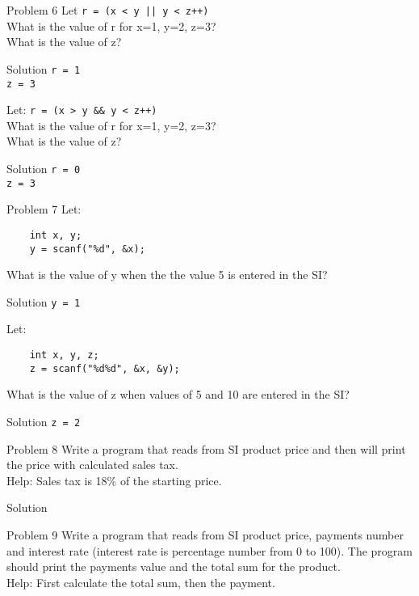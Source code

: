 \begin{frame}[fragile]{Problem 6}
Let \texttt{r = (x < y || y < z++)}\\
	What is the value of r for x=1, y=2, z=3?\\
	What is the value of z?
	\begin{exampleblock}{Solution}
	\texttt{r = 1\\z = 3}
	\end{exampleblock}
Let: \texttt{r = (x > y \&\& y < z++)}\\
	What is the value of r for x=1, y=2, z=3?\\
	What is the value of z?
	\begin{exampleblock}{Solution}
	\texttt{r = 0\\z = 3}
	\end{exampleblock}
\end{frame}

\begin{frame}[fragile]{Problem 7}
Let:
\begin{lstlisting}
	int x, y;
	y = scanf("%d", &x);
\end{lstlisting}
What is the value of y when the the value 5 is entered in the SI?
	\begin{exampleblock}{Solution}
	\texttt{y = 1}
	\end{exampleblock}
Let:
\begin{lstlisting}
	int x, y, z;
	z = scanf("%d%d", &x, &y);
\end{lstlisting}
	What is the value of z when values of 5 and 10 are entered in the SI?
	\begin{exampleblock}{Solution}
	\texttt{z = 2}
	\end{exampleblock}
\end{frame}


\begin{frame}[fragile]{Problem 8}
Write a program that reads from SI product price and then will print the
price with calculated sales tax.\\ Help: Sales tax is 18\% of the starting
price.
	\begin{exampleblock}{Solution}
		
	\end{exampleblock}
\end{frame}


\begin{frame}[fragile]{Problem 9}
Write a program that reads from SI product price, payments number and interest
rate (interest rate is percentage number from 0 to 100). The program should
print the payments value and the total sum for the product.\\
Help: First calculate the total sum, then the payment.
\end{frame}

